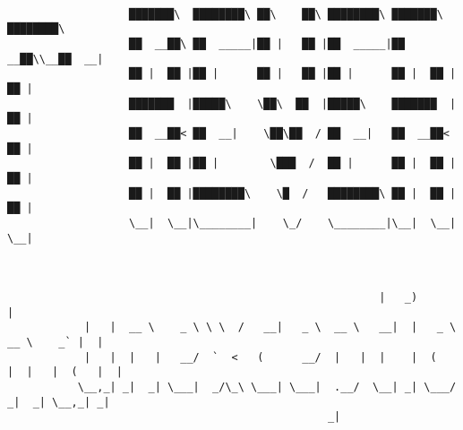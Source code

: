 \documentclass[varwidth=\maxdimen,margin=0.5cm,multi={verbatim}]{standalone}
\begin{document}
\begin{verbatim}

                   ███████\  ████████\ ██\    ██\ ████████\ ███████\ ████████\ 
                   ██  __██\ ██  _____|██ |   ██ |██  _____|██  __██\\__██  __|
                   ██ |  ██ |██ |      ██ |   ██ |██ |      ██ |  ██ |  ██ |   
                   ███████  |█████\    \██\  ██  |█████\    ███████  |  ██ |   
                   ██  __██< ██  __|    \██\██  / ██  __|   ██  __██<   ██ |   
                   ██ |  ██ |██ |        \███  /  ██ |      ██ |  ██ |  ██ |   
                   ██ |  ██ |████████\    \█  /   ████████\ ██ |  ██ |  ██ |   
                   \__|  \__|\________|    \_/    \________|\__|  \__|  \__|



                                                          |   _)                       | 
            |   |  __ \    _ \ \ \  /   __|   _ \  __ \   __|  |   _ \   __ \    _` |  | 
            |   |  |   |   __/  `  <   (      __/  |   |  |    |  (   |  |   |  (   |  | 
           \__,_| _|  _| \___|  _/\_\ \___| \___|  .__/  \__| _| \___/  _|  _| \__,_| _| 
                                                  _|



\end{verbatim}
\end{document}

